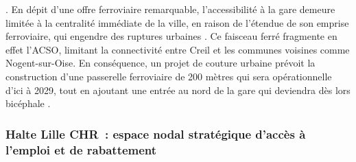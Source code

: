 \begin{refsegment}
{}. En dépit d'une offre ferroviaire remarquable, l’accessibilité à la gare demeure limitée à la centralité immédiate de la ville, en raison de l’étendue de son emprise ferroviaire, qui engendre des ruptures urbaines \textcolor{blue}{\autocite[19]{block_novel_2024}}. Ce faisceau ferré fragmente en effet l’\acrshort{ACSO}, limitant la connectivité entre Creil et les communes voisines comme Nogent-sur-Oise. En conséquence, un projet de couture urbaine prévoit la construction d'une passerelle ferroviaire de 200 mètres qui sera opérationnelle d’ici à 2029, tout en ajoutant une entrée au nord de la gare qui deviendra dès lors bicéphale \textcolor{blue}{\autocite[6]{conseil_regional_de_picardie_gare_2010}}.%

\subsubsection*{Halte Lille CHR~: espace nodal stratégique d'accès à l'emploi et de rabattement
    \label{chap3:application-observation-quantitative-lille-chr}
    }


\end{refsegment}
